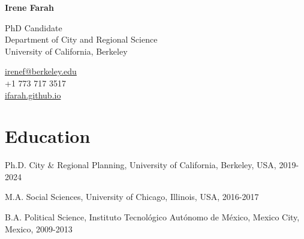 \documentclass[12pt,letterpaper]{report}
\newcommand{\myname}{Irene Farah}
\newcommand{\namefont}[1]{{\normalfont\bfseries\Huge{#1}}}
\begin{document}
    \raggedright{}

    \namefont{\myname}

    \vspace{1em}
    \begin{minipage}[t]{0.700\textwidth}
        PhD Candidate \\
        Department of City and Regional Science \\
        University of California, Berkeley
    \end{minipage}
    \begin{minipage}[t]{0.295\textwidth}
        \flushright{}
        \href{mailto:irenef@berkeley.edu}{irenef@berkeley.edu} \\
        +1 773 717 3517 \\
        \href{https://ifarah.github.io}{ifarah.github.io}\\
    \end{minipage}

    \section*{Education}
    
    \begin{tablist}
      \item[Ph.D.] \tab{}City \& Regional Planning, University of California, Berkeley, USA, 2019-2024 \\
      \item[M.A.] \tab{}Social Sciences, University of Chicago, Illinois, USA, 2016-2017
      \item[B.A.] \tab{}Political Science, Instituto Tecnológico Autónomo de México, Mexico City, Mexico, 2009-2013
    \end{tablist}
    
\end{document}
